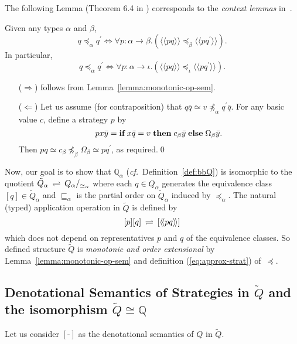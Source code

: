 \documentclass[fleqn]{LMCS}
\theoremstyle{plain}\newtheorem{satz}[thm]{Satz}
\theoremstyle{plain}\newtheorem{hyp}[thm]{Hypothesis}
\theoremstyle{plain}\newtheorem{hyps}[thm]{Hypotheses}
\theoremstyle{definition}\newtheorem{note}[thm]{Note}
\def\cf{{\em cf.}}
\newcommand{\defis}{\mbox{-}}
\newcommand{\bYdef}{\mathrel{\BYDEF}}
\newcommand{\BYDEF}{\mbox{$\hspace{.2em}\rightleftharpoons\hspace{.2em}$}}
\newcommand{\pr}{^{\prime}}
\newcommand{\arr}{\rightarrow}
\newcommand{\Arr}{\Rightarrow}
\newcommand{\Larr}{\Leftarrow}
\newcommand{\lla}{\langle\!\langle}
\newcommand{\rra}{\rangle\!\rangle}
\newcommand{\Osem}[1]{\lla #1 \rra}
\newcommand{\bbQ}{\mathbb{Q}}
\newcommand{\IF}{\mbox{\bf if}}
\newcommand{\THEN}{\mbox{\bf then}}
\newcommand{\ELSE}{\mbox{\bf else}}
\newcommand{\tQ}{\tilde{Q}}
\newcommand{\lee}{\preceq}
\newcommand{\sqle}{\sqsubseteq}
\newcommand{\?}{\mbox{?}}
\begin{document}
\noindent
The following Lemma 
(Theorem 6.4 in \cite{Saz76SMZH}) 
corresponds to the \emph{context lemmas} in~\cite{Milner77}. 

\begin{lem}\label{lemma:context}
 Given any types $\alpha$ and $\beta$,
\[q\lee_{\alpha} q\pr
\iff
\forall p:\alpha\arr\beta.(\Osem{pq}\lee_{\beta} \Osem{pq\pr}).
\]
In particular, 
\[q\lee_{\alpha} q\pr
\iff 
\forall p:\alpha\arr\iota.(\Osem{pq}\lee_{\iota} \Osem{pq\pr}).
\]
\end{lem}
\proof\hfill
\begin{itemize}  
\item[($\Arr$)] follows from Lemma~\ref{lemma:monotonic-op-sem}. 

\item[($\Larr$)]
Let us assume (for contraposition) that 
$q\bar{q}\simeq v\not\lee_{\alpha} q\pr\bar{q}$. 
For any basic value $c$, define a strategy $p$ by 
\[
px\bar{y}=\IF\;x\bar{q}=v\;\THEN\;c_{\beta}\bar{y}\;\ELSE\;\Omega_{\beta}\bar{y}.
\]
Then $pq\simeq c_{\beta} \not\lee_{\beta} \Omega_{\beta}\simeq pq\pr$, 
as required.\qed
\end{itemize}

\noindent
Now, our goal is to show that 
$\bbQ_\alpha$ (\cf\ Definition~\ref{def:bbQ}) 
is isomorphic to the quotient 
$\tQ_\alpha\bYdef Q_\alpha /_{\simeq_\alpha}$ where each $q\in Q_\alpha$ 
generates the equivalence class $[q]\in \tQ_\alpha$ and $\sqle_\alpha$ 
is the partial order on $\tQ_\alpha$ induced by $\lee_\alpha$. 
The natural (typed) application operation in
$\tQ$ is defined by 
\begin{equation}\label{eq:appl-in-tQ}
[p][q]\bYdef[\Osem{pq}]
\end{equation}
which does not depend on
representatives $p$ and $q$ of the equivalence classes. 
So defined structure $\tQ$ 
is \emph{monotonic and order extensional} by 
Lemma~\ref{lemma:monotonic-op-sem} and definition 
(\ref{eq:approx-strat}) of~$\lee$.
\nopagebreak
\subsection{Denotational Semantics of Strategies in 
\texorpdfstring{$\tQ$}{tilde-Q} 
and the isomorphism \texorpdfstring{$\tQ\cong\bbQ$}{of tilde-Q and inductively defined Q}}
\label{sec:den-sem-isomorphism}

Let us consider $[\defis]$ as the denotational semantics of $Q$ in $\tQ$.
\end{document}

